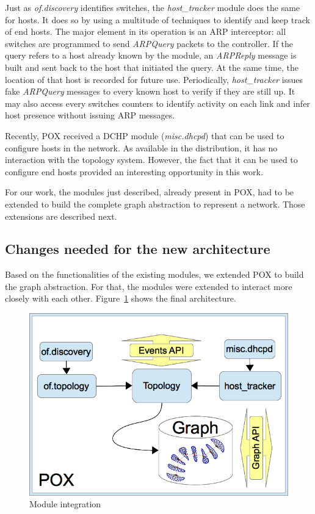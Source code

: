 Just as \emph{of.discovery} identifies switches, the \emph{host\_tracker}
module does the same for hosts. It does so by using a multitude of
techniques to identify and keep track of end hosts. The major element in
its operation is an ARP interceptor: all switches are programmed to send
\emph{ARPQuery} packets to the controller. If the query refers to a host
already known by the module, an \emph{ARPReply} message is built and sent
back to the host that initiated the query. At the same time, the location
of that host is recorded for future use. Periodically, \emph{host\_tracker}
issues fake \emph{ARPQuery} messages to every known host to verify if they
are still up. It may also access every switches counters to identify
activity on each link and infer host presence without issuing ARP messages.

Recently, POX received a DCHP module (\emph{misc.dhcpd})
that can be used to configure hosts in the
network. As available in the distribution, it has no interaction with the
topology system. However, the fact that it can be used to configure end
hosts provided an interesting opportunity in this work.

For our work, the modules just described, already present in POX,
had to be extended to build the
complete graph abstraction to represent a network. Those extensions are
described next.

\subsection{Changes needed for the new architecture}

Based on the functionalities of the existing modules,
we extended POX to build the graph abstraction. For that, the modules 
were extended to interact more closely with each other.
Figure~\ref{fig:design} shows the final architecture.

\begin{figure}[htb!]
    \centering
    \includegraphics[width=0.9\columnwidth]{img/modules}
    \caption{Module integration}
    \label{fig:design}
\end{figure}


